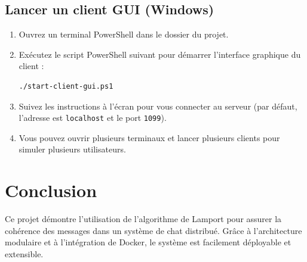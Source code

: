 \documentclass[a4paper,12pt]{article}
\begin{document}
\subsection{Lancer un client GUI (Windows)}
\begin{enumerate}
    \item Ouvrez un terminal PowerShell dans le dossier du projet.
    \item Exécutez le script PowerShell suivant pour démarrer l'interface graphique du client :
    \begin{lstlisting}[language=bash,caption={Démarrage du client GUI sous Windows}]
./start-client-gui.ps1
    \end{lstlisting}
    \item Suivez les instructions à l'écran pour vous connecter au serveur (par défaut, l'adresse est \texttt{localhost} et le port \texttt{1099}).
    \item Vous pouvez ouvrir plusieurs terminaux et lancer plusieurs clients pour simuler plusieurs utilisateurs.
\end{enumerate}

\section{Conclusion}
Ce projet démontre l'utilisation de l'algorithme de Lamport pour assurer la cohérence des messages dans un système de chat distribué. Grâce à l'architecture modulaire et à l'intégration de Docker, le système est facilement déployable et extensible.
\end{document}
